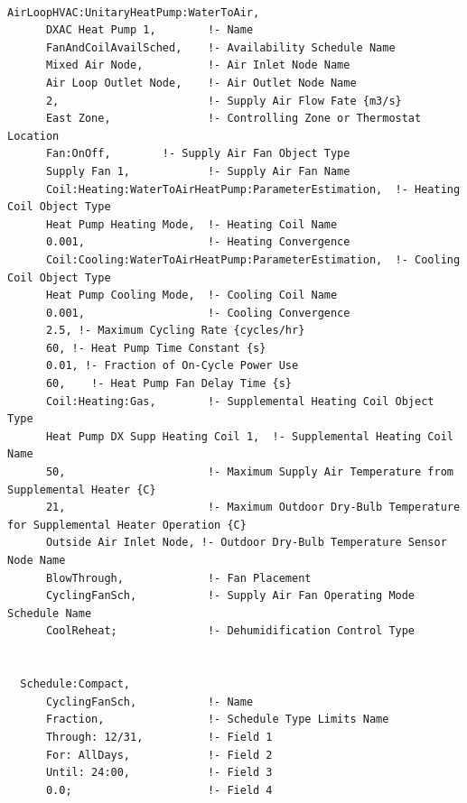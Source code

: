 \begin{lstlisting}

AirLoopHVAC:UnitaryHeatPump:WaterToAir,
      DXAC Heat Pump 1,        !- Name
      FanAndCoilAvailSched,    !- Availability Schedule Name
      Mixed Air Node,          !- Air Inlet Node Name
      Air Loop Outlet Node,    !- Air Outlet Node Name
      2,                       !- Supply Air Flow Fate {m3/s}
      East Zone,               !- Controlling Zone or Thermostat Location
      Fan:OnOff,        !- Supply Air Fan Object Type
      Supply Fan 1,            !- Supply Air Fan Name
      Coil:Heating:WaterToAirHeatPump:ParameterEstimation,  !- Heating Coil Object Type
      Heat Pump Heating Mode,  !- Heating Coil Name
      0.001,                   !- Heating Convergence
      Coil:Cooling:WaterToAirHeatPump:ParameterEstimation,  !- Cooling Coil Object Type
      Heat Pump Cooling Mode,  !- Cooling Coil Name
      0.001,                   !- Cooling Convergence
      2.5, !- Maximum Cycling Rate {cycles/hr}
      60, !- Heat Pump Time Constant {s}
      0.01, !- Fraction of On-Cycle Power Use
      60,    !- Heat Pump Fan Delay Time {s}
      Coil:Heating:Gas,        !- Supplemental Heating Coil Object Type
      Heat Pump DX Supp Heating Coil 1,  !- Supplemental Heating Coil Name
      50,                      !- Maximum Supply Air Temperature from Supplemental Heater {C}
      21,                      !- Maximum Outdoor Dry-Bulb Temperature for Supplemental Heater Operation {C}
      Outside Air Inlet Node, !- Outdoor Dry-Bulb Temperature Sensor Node Name
      BlowThrough,             !- Fan Placement
      CyclingFanSch,           !- Supply Air Fan Operating Mode Schedule Name
      CoolReheat;              !- Dehumidification Control Type


  Schedule:Compact,
      CyclingFanSch,           !- Name
      Fraction,                !- Schedule Type Limits Name
      Through: 12/31,          !- Field 1
      For: AllDays,            !- Field 2
      Until: 24:00,            !- Field 3
      0.0;                     !- Field 4





\end{lstlisting}
